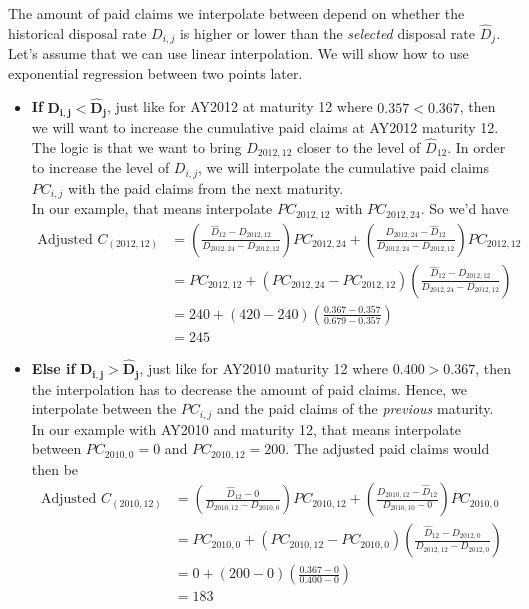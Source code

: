 \documentclass[11pt, english]{memoir}
\numberwithin{definition}{section}
\begin{document}
\begin{enumerate}
		The amount of paid claims we interpolate between depend on whether the historical disposal rate $ D_{i,j} $ is higher or lower than the \emph{selected} disposal rate $ \hat{D}_{j} $. Let's assume that we can use linear interpolation. We will show how to use exponential regression between two points later. 
		\begin{itemize}
			\item \textbf{If} $ \mathbf{D_{i,j} < \hat{D}_{j}} $, just like for AY2012 at maturity 12 where $ 0.357 < 0.367 $, then we will want to increase the cumulative paid claims at AY2012 maturity 12. The logic is that we want to bring $ D_{2012,12} $ closer to the level of $ \hat{D}_{12} $. In order to increase the level of $ D_{i,j} $, we will interpolate the cumulative paid claims $ PC_{i,j} $ with the paid claims from the next maturity. \\
			
			In our example, that means interpolate $ PC_{2012, 12} $ with $ PC_{2012, 24} $. So we'd have 
			\begin{align*}
			\text{Adjusted }C_{(2012, 12)} &= \left(\frac{\hat{D}_{12} - D_{2012, 12}}{D_{2012, 24} - D_{2012, 12}}\right)PC_{2012, 24} + \left(\frac{D_{2012, 24} - \hat{D}_{12}}{D_{2012, 24} - D_{2012, 12}}\right)PC_{2012, 12}\\
			&= PC_{2012, 12} + \left(PC_{2012, 24} - PC_{2012, 12} \right)\left( \frac{\hat{D}_{12} - D_{2012, 12}}{D_{2012, 24} - D_{2012, 12}}\right)\\
			&= 240 + (420 - 240)\left(\frac{0.367 - 0.357}{0.679 - 0.357}\right)\\
			&= 245
			\end{align*}
		
			\item \textbf{Else if} $ \mathbf{D_{i,j} > \hat{D}_{j}} $, just like for AY2010 maturity 12 where $ 0.400>0.367 $, then the interpolation has to decrease the amount of paid claims. Hence, we interpolate between the $ PC_{i,j} $ and the paid claims of the \emph{previous} maturity. \\
			
			In our example with AY2010 and maturity 12, that means interpolate between $ PC_{2010, 0} = 0 $ and $ PC_{2010, 12} = 200 $. The adjusted paid claims would then be 
			\begin{align*}
			\text{Adjusted }C_{(2010, 12)} &= \left(\frac{\hat{D}_{12} - 0}{D_{2010, 12} - D_{2010, 0}}\right)PC_{2010, 12} + \left(\frac{D_{2010, 12} - \hat{D}_{12}}{D_{2010, 10} - 0}\right)PC_{2010, 0}\\
			&= PC_{2010, 0} + \left(PC_{2010, 12} - PC_{2010, 0} \right)\left( \frac{\hat{D}_{12} - D_{2012, 0}}{D_{2012, 12} - D_{2012, 0}}\right)\\
			&= 0 + (200 - 0)\left(\frac{0.367 - 0}{0.400 - 0}\right)\\
			&= 183
			\end{align*}
		\end{itemize}
	

\end{enumerate}
\end{document}
